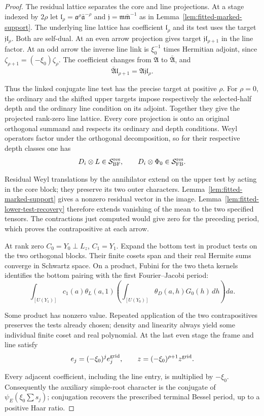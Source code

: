 \begin{proof}
The residual lattice separates the core and line projections.
At a stage indexed by \(2\rho\) let
\(\mathfrak l_\rho=\mathfrak a^\rho\bar{\mathfrak a}^{-\rho}\) and
\(\mathfrak j=\mathfrak m\bar{\mathfrak m}^{-1}\) as in
Lemma~\ref{lem:fitted-marked-support}. 
The underlying line lattice
has coefficient \(\mathfrak l_\rho\) and its test uses the target
\(\mathfrak j\mathfrak l_\rho\). Both are self-dual. At an even
arrow projection gives target \(\mathfrak j\mathfrak l_{\rho+1}\)
in the line factor. At an odd arrow the inverse line link is
\(\xi_0^{-1}\) times Hermitian adjoint, since
\(\zeta_{\rho+1}=(-\xi_0)\zeta_\rho\). The coefficient changes
from \(\mathfrak A\) to \(\bar{\mathfrak A}\), and
\[
    \bar{\mathfrak A}\mathfrak l_{\rho+1}
                =\mathfrak A\mathfrak j\mathfrak l_\rho .
\]

Thus the linked conjugate line test has the precise target at
positive \(\rho\). For \(\rho=0\), the ordinary and the shifted
upper targets impose respectively the selected-half depth and the
ordinary line condition on its adjoint. Together they give the
projected rank-zero line lattice. Every core projection is onto
an original orthogonal summand and respects its ordinary and
depth conditions. Weyl operators factor under the orthogonal
decomposition, so for their respective depth classes one has
\[
 D_i\otimes L\in\mathcal S_{\rm BF}^{\rm res},\qquad D_i\otimes\Phi_0\in\mathcal S_{\rm FB}^{\rm res}.
\]


Residual Weyl translations by the annihilator extend on the upper
test by acting in the core block; they preserve its two outer
characters. Lemma~\ref{lem:fitted-marked-support} gives a nonzero
residual vector in the image. Lemma~\ref{lem:fitted-lower-test-recovery}
therefore extends vanishing of the mean to the two specified
tensors. The contractions just computed would give zero for the
preceding period, which proves the contrapositive at each arrow.

At rank zero \(C_0=Y_0\perp L_z\), \(C_1=Y_1\).
Expand the bottom test in product tests on the two orthogonal blocks.
Their finite cosets span and their real Hermite sums converge
in Schwartz space. On a product, Fubini for the two theta kernels
identifies the bottom pairing with the first Fourier--Jacobi
period:
\[
 \int_{[U(Y_1)]} c_1(a)\theta_L(a,1)
       \left(\int_{[U(Y_0)]}\theta_D(a,h)G_0(h)\,dh\right) da .
\]

Some product has nonzero value. Repeated application of the two
contrapositives preserves the tests already chosen; density and
linearity always yield some individual finite coset and real
polynomial. At the last even stage the frame and line satisfy
\[
 e_j=(-\xi_0)^j e^{\rm grid}_j,\qquad z=(-\xi_0)^{\rho+1}z^{\rm grid}.
\]

Every adjacent coefficient, including the line entry, is multiplied
by \(-\xi_0\). Consequently the auxiliary simple-root character
is the conjugate of \(\psi_E(\xi_0\sum s_j)\); conjugation recovers
the prescribed terminal Bessel period, up to a positive Haar ratio.
\end{proof}

